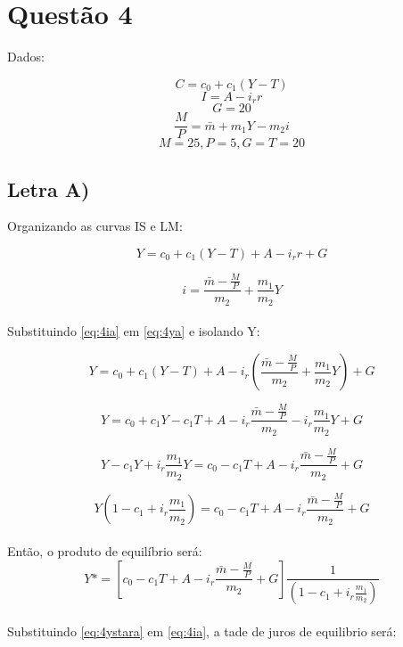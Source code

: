 \documentclass{article}
\begin{document}
\section*{Questão 4}
Dados:

$$ C = c_0 + c_1(Y - T) $$
$$ I = A - i_r r $$
$$G=20$$
$$ \frac{M}{P} =  \bar{m} + m_1 Y - m_2 i $$
$$M=25, P=5, G=T=20$$

\subsection*{Letra A)}
Organizando as curvas IS e LM:

\begin{equation}\label{eq:4ya}
Y = c_0 + c_1(Y - T) + A - i_r r + G
\end{equation}

\begin{equation}\label{eq:4ia}
i =  \frac{\bar{m}-\frac{M}{P}}{m_2} + \frac{m_1}{m_2} Y
\end{equation}
\\
Substituindo \eqref{eq:4ia} em \eqref{eq:4ya} e isolando Y:

\begin{equation}
Y = c_0 + c_1(Y - T) + A - i_r (\frac{\bar{m}-\frac{M}{P}}{m_2} + \frac{m_1}{m_2} Y) + G
\end{equation}

\begin{equation}
Y = c_0 + c_1Y - c_1 T + A - i_r \frac{\bar{m}-\frac{M}{P}}{m_2} -i_r \frac{m_1}{m_2} Y + G
\end{equation}

\begin{equation}
Y - c_1Y + i_r \frac{m_1}{m_2} Y = c_0 - c_1 T + A - i_r \frac{\bar{m}-\frac{M}{P}}{m_2} + G
\end{equation}

\begin{equation}
Y (1 - c_1 + i_r \frac{m_1}{m_2}) = c_0 - c_1 T + A - i_r \frac{\bar{m}-\frac{M}{P}}{m_2} + G
\end{equation}
\\
Então, o produto de equilíbrio será:
\begin{equation}\label{eq:4ystara}
Y* = [c_0 - c_1 T + A - i_r \frac{\bar{m}-\frac{M}{P}}{m_2} + G] \frac{1}{(1 - c_1 + i_r \frac{m_1}{m_2})}
\end{equation}
\\
Substituindo \eqref{eq:4ystara} em \eqref{eq:4ia}, a tade de juros de equilibrio será:
\end{document}
